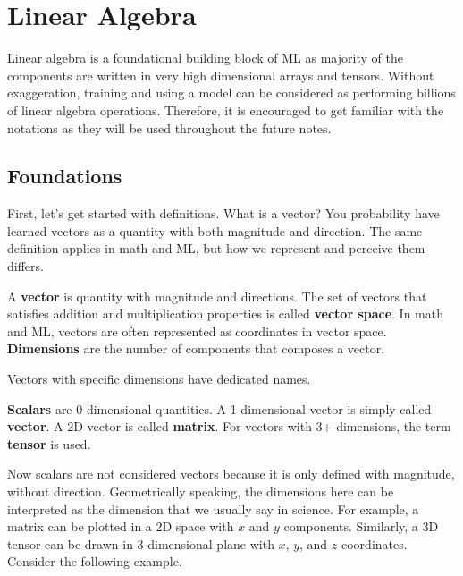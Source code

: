 \documentclass[../main.tex]{subfiles}
\begin{document}
\section{Linear Algebra}

Linear algebra is a foundational building block of ML as majority
of the components are written in very high dimensional arrays
and tensors. Without exaggeration, training and using a model
can be considered as performing billions of linear algebra
operations. Therefore, it is encouraged to get familiar with
the notations as they will be used throughout the future notes.

\subsection{Foundations}

First, let's get started with definitions. What is a vector?
You probability have learned vectors as a quantity with both
magnitude and direction. The same definition applies in math
and ML, but how we represent and perceive them differs.

\begin{definition}{}{}
A \textbf{vector} is quantity with magnitude and directions.
The set of vectors that satisfies addition and multiplication
properties is called \textbf{vector space}. In math and ML,
vectors are often represented as coordinates in vector space.
\textbf{Dimensions} are the number of components that composes
a vector.
\end{definition}

Vectors with specific dimensions have dedicated names.

\begin{definition}{}{}
\textbf{Scalars} are 0-dimensional quantities. A 1-dimensional
vector is simply called \textbf{vector}. A 2D vector is called
\textbf{matrix}. For vectors with 3+ dimensions, the term
\textbf{tensor} is used.
\end{definition}

Now scalars are not considered vectors because it is only
defined with magnitude, without direction. Geometrically speaking,
the dimensions here can be interpreted as the dimension that
we usually say in science. For example, a matrix can be plotted
in a 2D space with $x$ and $y$ components. Similarly, a 3D
tensor can be drawn in 3-dimensional plane with $x$, $y$, and $z$
coordinates. Consider the following example.
\end{document}
